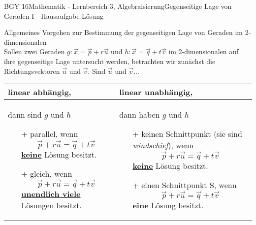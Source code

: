 \documentclass[oneside,openany,headings=optiontotoc,11pt,numbers=noenddot]{scrreprt}
\begin{document}
	\begin{worksheet}{BGY 16}{Mathematik - Lernbereich 3, Algebraisierung}{Gegenseitige Lage von Geraden I - Hausaufgabe Lösung}
		
		\begin{framed}
			\noindent
			\tiny{\color{codegray}Allgemeines Vorgehen zur Bestimmung der gegenseitigen Lage von Geraden im 2-dimensionalen}\\
			\normalsize
			Sollen zwei Geraden \(g: \vec{x} = \vec{p} + r\vec{u}\) und \(h: \vec{x} = \vec{q}+ t\vec{v}\) im 2-dimensionalen auf ihre gegenseitige Lage untersucht werden, betrachten wir zunächst die Richtungsvektoren \(\vec{u}\) und \(\vec{v}\). Sind \(\vec{u}\) und \(\vec{v}\)...\\
			\par\noindent
			\begin{tabularx}{\textwidth}{X|X}
				\color{blue}linear abhängig\normalcolor, & \color{blue}linear unabhängig\normalcolor,\\
				\hline
				dann sind \(g\) und \(h\)
				\begin{itemize}
					\item[+] \color{codegreen}parallel\normalcolor{}, wenn \[\vec{p} + r\vec{u} = \vec{q} + t\vec{v}\] \underline{\textbf{keine}} Lösung besitzt.
					\item[+] \color{red}gleich\normalcolor{}, wenn \[\vec{p} + r\vec{u} = \vec{q} + t\vec{v}\] \underline{\textbf{unendlich viele}} Lösungen besitzt.
				\end{itemize} & dann haben \(g\) und \(h\)
			\begin{itemize}
				\item[+] \color{codegreen}keinen\normalcolor{} Schnittpunkt (sie sind \textit{windschief}), wenn \[\vec{p} + r\vec{u} = \vec{q} + t\vec{v}\] \underline{\textbf{keine}} Lösung besitzt.
				\item[+] \color{red}einen\normalcolor{} Schnittpunkt S, wenn \[\vec{p} + r\vec{u} = \vec{q} + t\vec{v}\] \underline{\textbf{eine}} Lösung besitzt.
				
		\end{itemize}\\
			\end{tabularx}
		\end{framed}
		

\end{worksheet}
\end{document}
